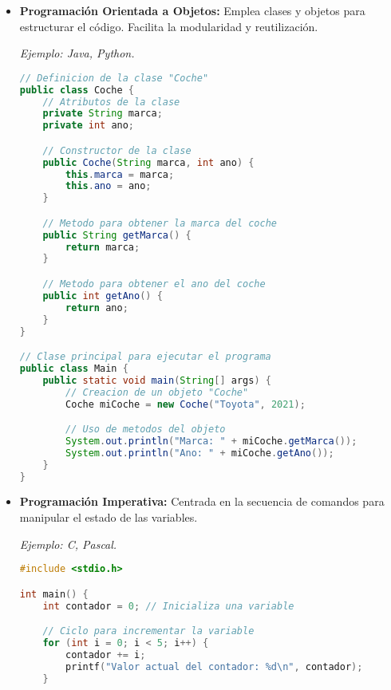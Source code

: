 \documentclass{report}
\begin{document}
\begin{itemize}
\item \textbf{Programación Orientada a Objetos:} Emplea clases y objetos para estructurar el código. Facilita la modularidad y reutilización. 

\textit{Ejemplo: Java, Python.}

\begin{minipage}{\linewidth} %
\begin{lstlisting}[language=Java, caption=Ejemplo de POO en Java]
// Definicion de la clase "Coche"
public class Coche {
    // Atributos de la clase
    private String marca;
    private int ano;

    // Constructor de la clase
    public Coche(String marca, int ano) {
        this.marca = marca;
        this.ano = ano;
    }

    // Metodo para obtener la marca del coche
    public String getMarca() {
        return marca;
    }

    // Metodo para obtener el ano del coche
    public int getAno() {
        return ano;
    }
}

// Clase principal para ejecutar el programa
public class Main {
    public static void main(String[] args) {
        // Creacion de un objeto "Coche"
        Coche miCoche = new Coche("Toyota", 2021);

        // Uso de metodos del objeto
        System.out.println("Marca: " + miCoche.getMarca());
        System.out.println("Ano: " + miCoche.getAno());
    }
}
\end{lstlisting}
\end{minipage} %

\item \textbf{Programación Imperativa:} Centrada en la secuencia de comandos para manipular el estado de las variables. 

\textit{Ejemplo: C, Pascal.}

\begin{minipage}{\linewidth} %
\begin{lstlisting}[language=C, caption=Ejemplo de Programacion Imperativa en C]
#include <stdio.h>

int main() {
    int contador = 0; // Inicializa una variable

    // Ciclo para incrementar la variable
    for (int i = 0; i < 5; i++) {
        contador += i;
        printf("Valor actual del contador: %d\n", contador);
    }


\end{lstlisting}
\end{minipage}
\end{itemize}
\end{document}
